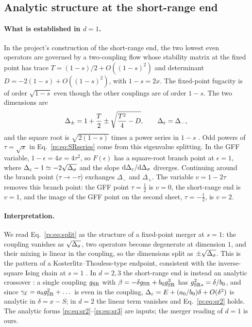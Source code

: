 \subsection{Analytic structure at the short-range end}\label{rs:sec:analytic}
\paragraph{What is established in $d=1$.} In the project's construction of the
short-range end, the two lowest even operators are governed by a two-coupling flow whose
stability matrix at the fixed point has trace $T=(1-s)/2+O((1-s)^2)$ and determinant
$D=-2(1-s)+O((1-s)^2)$, with $1-s=2x$. The fixed-point fugacity is of order $\sqrt{1-s}$
even though the other couplings are of order $1-s$. The two dimensions
are
\begin{equation}
 \Delta_\pm=1+\frac T2\pm\sqrt{\frac{T^2}{4}-D},\qquad \Delta_\varepsilon=\Delta_-,
 \label{rs:eq:split}
\end{equation}
and the square root is $\sqrt{2(1-s)}$ times a power series in $1-s$
\cite{rs:Benedetti:2025nzp}. Odd powers of $\tau=\sqrt x$ in Eq.~\eqref{rs:eq:SRseries} come from
this eigenvalue splitting. In the GFF variable, $1-\epsilon=4x=4\tau^2$, so $F(\epsilon)$ has
a square-root branch point at $\epsilon=1$, where $\Delta_\varepsilon-1\simeq-2\sqrt{\Delta_\sigma}$ and the slope
$\mathrm d\Delta_\varepsilon/\mathrm d\Delta_\sigma$ diverges. Continuing around the branch point ($\tau\to-\tau$)
exchanges $\Delta_-$ and $\Delta_+$. The variable $v=1-2\tau$ removes this branch point:
the GFF point $\tau=\frac12$ is $v=0$, the short-range end is $v=1$, and the image of the
GFF point on the second sheet, $\tau=-\frac12$, is $v=2$.

\paragraph{Interpretation.} We read Eq.~\eqref{rs:eq:split} as the structure of a
fixed-point merger at $s=1$: the coupling vanishes as $\sqrt{\Delta_\sigma}$, two operators become
degenerate at dimension $1$, and their mixing is linear in the coupling, so the
dimensions split as $\pm\sqrt{\Delta_\sigma}$. This is the pattern of a Kosterlitz--Thouless-type
endpoint, consistent with the inverse-square Ising chain at $s=1$ \cite{rs:Kosterlitz:1976zz}.
In $d=2,3$ the short-range end is instead an analytic crossover \cite{rs:Behan:2017emf}: a
single coupling $g_{\rm SR}$ with $\beta=-\delta g_{\rm SR}+b_0g_{\rm SR}^3$ has
$g_{\rm SR*}^2=\delta/b_0$, and since $\gamma_{\mathcal E}=a_0g_{\rm SR}^2+\dots$ is even in the
coupling, $\Delta_\varepsilon=E+(a_0/b_0)\delta+O(\delta^2)$ is analytic in $\delta=x-S$; in $d=2$ the
linear term vanishes and Eq.~\eqref{rs:eq:sr2} holds. The analytic forms
\eqref{rs:eq:sr2}--\eqref{rs:eq:sr3} are inputs; the merger reading of $d=1$ is ours.

